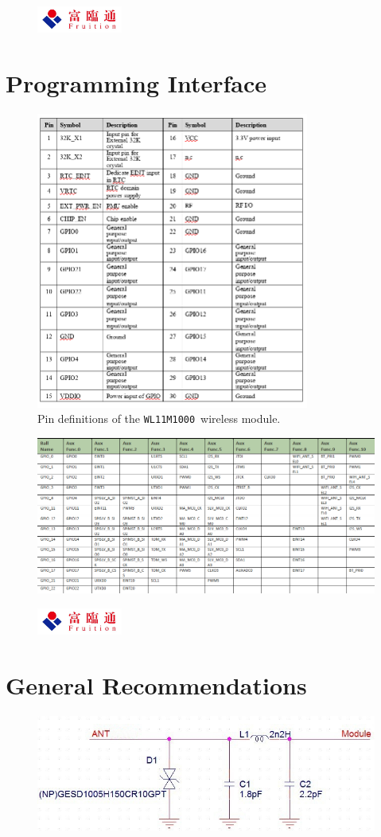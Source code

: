 \documentclass{scrreprt}
\newcommand{\pchapter}[1]{
	\begingroup\let\clearpage\relax
	\newpage
	\begin{figure}[H]
		\includegraphics[width=0.25\textwidth]{logo.jpeg}
	\end{figure}
	\chapter{#1}
	\endgroup
}
\newcommand{\modelno}{\texttt{WL11M1000}}
\begin{document}
\begin{CJK*}{UTF8}{gbsn}
\pchapter{Programming Interface}

\begin{figure}[H]
\caption{Pin definitions of the \modelno\ wireless module.}
\includegraphics[width=0.8\textwidth]{pin_definitions.png}
\end{figure}

\begin{figure}[H]
\includegraphics[width=\textwidth]{unknown.png}
\end{figure}

\pchapter{General Recommendations}

\begin{figure}[H]
\includegraphics{circuit.png}
\end{figure}


\end{CJK*}
\end{document}

